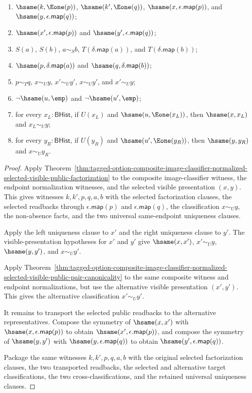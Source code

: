 \begin{theorem}
\begin{enumerate}
$U(\epsilon.\mathsf{map}(q))$;
\item $\hsame(k,\Eone(p))$, $\hsame(k',\Eone(q))$,
$\hsame(x,\epsilon.\mathsf{map}(p))$, and
$\hsame(y,\epsilon.\mathsf{map}(q))$;
\item $\hsame(x',\epsilon.\mathsf{map}(p))$ and
$\hsame(y',\epsilon.\mathsf{map}(q))$;
\item $S(a)$, $S(b)$, $a\sim_S b$, $T(\delta.\mathsf{map}(a))$, and
$T(\delta.\mathsf{map}(b))$;
\item $\hsame(p,\delta.\mathsf{map}(a))$ and
$\hsame(q,\delta.\mathsf{map}(b))$;
\item $p\sim_T q$, $x\sim_U y$, $x'\sim_U y'$, $x\sim_U y'$, and $x'\sim_U y$;
\item $\neg\hsame(u,\emp)$ and $\neg\hsame(u',\emp)$;
\item for every $x_L:\mathsf{BHist}$, if $U(x_L)$ and
$\hsame(u,\Eone(x_L))$, then $\hsame(x,x_L)$ and $x_L\sim_U y$;
\item for every $y_R:\mathsf{BHist}$, if $U(y_R)$ and
$\hsame(u',\Eone(y_R))$, then $\hsame(y,y_R)$ and $x\sim_U y_R$.
\end{enumerate}
\end{theorem}
\begin{proof}
Apply
Theorem~\ref{thm:tagged-option-composite-image-classifier-normalized-selected-visible-public-factorization}
to the composite image-classifier witness, the endpoint normalization witnesses,
and the selected visible presentation $(x,y)$. This gives witnesses
$k,k',p,q,a,b$ with the selected factorization clauses, the selected readbacks
through $\epsilon.\mathsf{map}(p)$ and $\epsilon.\mathsf{map}(q)$, the
classification $x\sim_U y$, the non-absence facts, and the two universal
same-endpoint uniqueness clauses.

Apply the left uniqueness clause to $x'$ and the right uniqueness clause to
$y'$. The visible-presentation hypotheses for $x'$ and $y'$ give
$\hsame(x,x')$, $x'\sim_U y$, $\hsame(y,y')$, and $x\sim_U y'$.

Apply
Theorem~\ref{thm:tagged-option-composite-image-classifier-normalized-selected-visible-public-pair-canonicality}
to the same composite witness and endpoint normalizations, but use the
alternative visible presentation $(x',y')$. This gives the alternative
classification $x'\sim_U y'$.

It remains to transport the selected public readbacks to the alternative
representatives. Compose the symmetry of $\hsame(x,x')$ with
$\hsame(x,\epsilon.\mathsf{map}(p))$ to obtain
$\hsame(x',\epsilon.\mathsf{map}(p))$, and compose the symmetry of
$\hsame(y,y')$ with $\hsame(y,\epsilon.\mathsf{map}(q))$ to obtain
$\hsame(y',\epsilon.\mathsf{map}(q))$.

Package the same witnesses $k,k',p,q,a,b$ with the original selected
factorization clauses, the two transported readbacks, the selected and
alternative target classifications, the two cross-classifications, and the
retained universal uniqueness clauses.
\end{proof}
